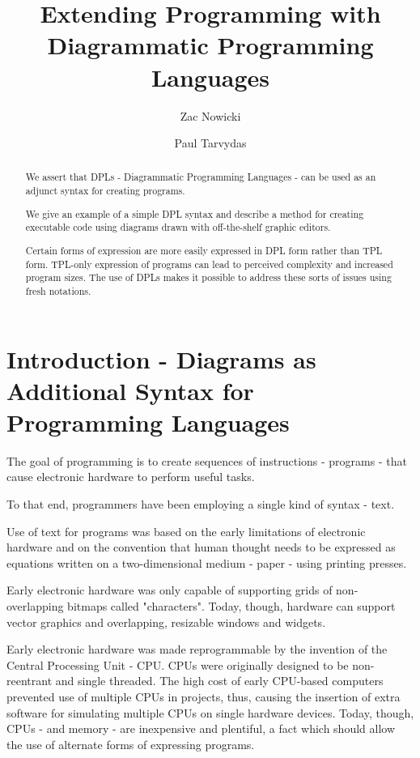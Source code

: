 \documentclass[10pt]{acmart}
\title{Extending Programming with Diagrammatic Programming Languages}
\author{Zac Nowicki}
\affiliation{
  \institution{Kagi Inc.}
  \city{Palo Alto}
  \state{CA}
  \country{USA}
}
\author{Paul Tarvydas}
\affiliation{
  \institution{Retired}
  \city{Toronto}
  \state{Ontario}
  \country{Canada}
}
\begin{document}
\begin{abstract}

We assert that DPLs - Diagrammatic Programming Languages - can be used as an adjunct syntax for creating programs.

We give an example of a simple DPL syntax and describe a method for creating executable code using diagrams drawn with off-the-shelf graphic editors.
  
Certain forms of expression are more easily expressed in DPL form rather than TPL form. TPL-only expression of programs can lead to perceived complexity and increased program sizes. The use of DPLs makes it possible to address these sorts of issues using fresh notations.
\end{abstract}

\maketitle

\section{Introduction - Diagrams as Additional Syntax for Programming Languages}
The goal of programming is to create sequences of instructions -
programs - that cause electronic hardware to perform useful tasks.

To that end, programmers have been employing a single kind of syntax -
text.

Use of text for programs was based on the early limitations of
electronic hardware and on the convention that human thought needs to be
expressed as equations written on a two-dimensional medium - paper -
using printing presses.

Early electronic hardware was only capable of supporting grids of
non-overlapping bitmaps called "characters". Today, though, hardware can
support vector graphics and overlapping, resizable windows and widgets.

Early electronic hardware was made reprogrammable by the invention of
the Central Processing Unit - CPU. CPUs were originally designed to be
non-reentrant and single threaded. The high cost of early CPU-based
computers prevented use of multiple CPUs in projects, thus, causing the
insertion of extra software for simulating multiple CPUs on single
hardware devices. Today, though, CPUs - and memory - are inexpensive and
plentiful, a fact which should allow the use of alternate forms of
expressing programs.
\end{document}
